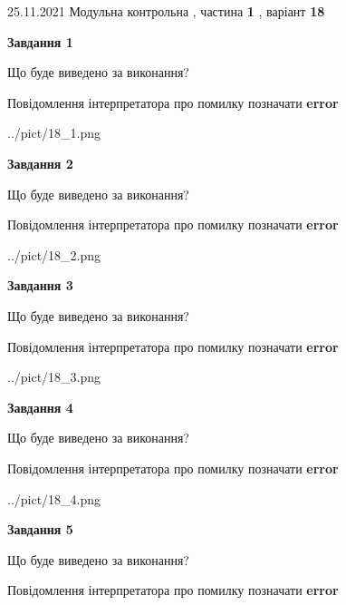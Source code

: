 \documentclass[10pt, ukrainian]{article}
\begin{document}
{25.11.2021 Модульна контрольна , частина \textbf { 1 }, варіант  \No \textbf { 18 }\par}
{
\begin {large}

{\begin {center}\textbf{Завдання 1}\end {center}}\par
Що буде виведено за виконання? \par
Повідомлення інтерпретатора про помилку позначати \textbf{error}

\begin{center}
	{../pict/18_1.png}
\end{center}
\newpage

{\begin {center}\textbf{Завдання 2}\end {center}}\par
Що буде виведено за виконання? \par
Повідомлення інтерпретатора про помилку позначати \textbf{error}

\begin{center}
	{../pict/18_2.png}
\end{center}
\newpage

{\begin {center}\textbf{Завдання 3}\end {center}}\par
Що буде виведено за виконання? \par
Повідомлення інтерпретатора про помилку позначати \textbf{error}

\begin{center}
	{../pict/18_3.png}
\end{center}
\newpage

{\begin {center}\textbf{Завдання 4}\end {center}}\par
Що буде виведено за виконання? \par
Повідомлення інтерпретатора про помилку позначати \textbf{error}

\begin{center}
	{../pict/18_4.png}
\end{center}
\newpage

{\begin {center}\textbf{Завдання 5}\end {center}}\par
Що буде виведено за виконання? \par
Повідомлення інтерпретатора про помилку позначати \textbf{error}


\end{large}}
\end{document}
